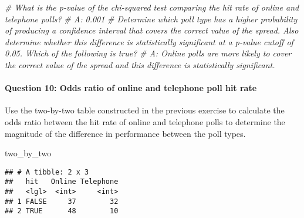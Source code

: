 \documentclass[
]{article}
\newenvironment{Shaded}{\begin{snugshade}}{\end{snugshade}}
\newcommand{\CommentTok}[1]{\textcolor[rgb]{0.56,0.35,0.01}{\textit{#1}}}
\newcommand{\NormalTok}[1]{#1}
\begin{document}
\begin{Shaded}
\begin{Highlighting}[]
\CommentTok{\# What is the p{-}value of the chi{-}squared test comparing the hit rate of online and telephone polls?}
\CommentTok{\# A: 0.001}
\CommentTok{\# Determine which poll type has a higher probability of producing a confidence interval that covers the correct value of the spread. Also determine whether this difference is statistically significant at a p{-}value cutoff of 0.05. Which of the following is true?}
\CommentTok{\# A: Online polls are more likely to cover the correct value of the spread and this difference is statistically significant.}
\end{Highlighting}
\end{Shaded}

\hypertarget{question-10-odds-ratio-of-online-and-telephone-poll-hit-rate}{%
\paragraph{Question 10: Odds ratio of online and telephone poll hit
rate}\label{question-10-odds-ratio-of-online-and-telephone-poll-hit-rate}}

Use the two-by-two table constructed in the previous exercise to
calculate the odds ratio between the hit rate of online and telephone
polls to determine the magnitude of the difference in performance
between the poll types.

\begin{Shaded}
\begin{Highlighting}[]
\NormalTok{two\_by\_two}
\end{Highlighting}
\end{Shaded}

\begin{verbatim}
## # A tibble: 2 x 3
##   hit   Online Telephone
##   <lgl>  <int>     <int>
## 1 FALSE     37        32
## 2 TRUE      48        10
\end{verbatim}
\end{document}
